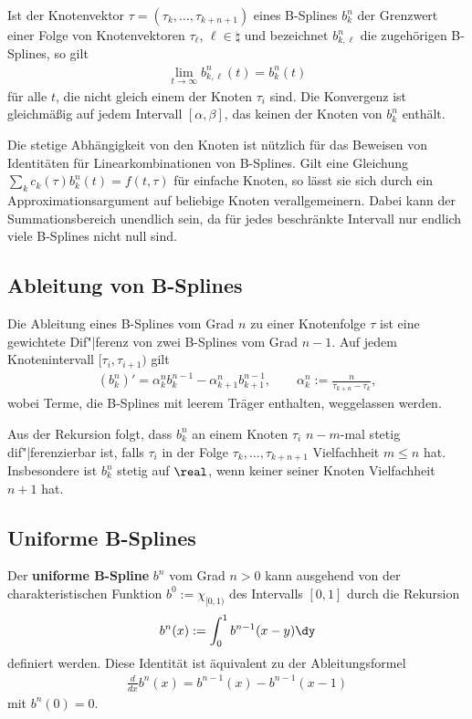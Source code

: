 Ist der Knotenvektor $\tau = (\tau_k, \dotsc, \tau_{k+n+1})$ eines B-Splines
$b_k^n$ der Grenzwert einer Folge von Knotenvektoren $\tau_\ell$,
$\ell \in \natural$ und bezeichnet $b_{k,\ell}^n$ die zugehörigen B-Splines,
so gilt
\begin{align*}
    \lim_{t \to \infty} b_{k,\ell}^n(t) = b_k^n(t)
\end{align*}
für alle $t$, die nicht gleich einem der Knoten $\tau_i$ sind.
Die Konvergenz ist gleichmäßig auf jedem Intervall $[\alpha, \beta]$,
das keinen der Knoten von $b_k^n$ enthält.

\linie

Die stetige Abhängigkeit von den Knoten ist nützlich für das Beweisen von
Identitäten für Linearkombinationen von B-Splines.
Gilt eine Gleichung $\sum_k c_k(\tau) b_k^n(t) = f(t, \tau)$
für einfache Knoten, so lässt sie sich durch ein Approximationsargument auf
beliebige Knoten verallgemeinern.
Dabei kann der Summationsbereich unendlich sein, da für jedes beschränkte
Intervall nur endlich viele B-Splines nicht null sind.

\pagebreak

\subsection{%
    Ableitung von B-Splines%
}

Die Ableitung eines B-Splines vom Grad $n$ zu einer Knotenfolge $\tau$ ist
eine gewichtete Dif"|ferenz von zwei B-Splines vom Grad $n - 1$.
Auf jedem Knotenintervall $[\tau_i, \tau_{i+1})$ gilt
\begin{align*}
    (b_k^n)' = \alpha_k^n b_k^{n-1} - \alpha_{k+1}^n b_{k+1}^{n-1}, \qquad
    \alpha_k^n := \frac{n}{\tau_{k+n} - \tau_k},
\end{align*}
wobei Terme, die B-Splines mit leerem Träger enthalten, weggelassen werden.

Aus der Rekursion folgt, dass $b_k^n$ an einem Knoten $\tau_i$ $n - m$-mal
stetig dif"|ferenzierbar ist, falls $\tau_i$ in der Folge
$\tau_k, \dotsc, \tau_{k+n+1}$ Vielfachheit $m \le n$ hat.
Insbesondere ist $b_k^n$ stetig auf $\real$, wenn keiner seiner Knoten
Vielfachheit $n + 1$ hat.

\subsection{%
    Uniforme B-Splines%
}

Der \textbf{uniforme B-Spline} $b^n$ vom Grad $n > 0$ kann ausgehend von der
charakteristischen Funktion $b^0 := \chi_{[0,1)}$ des Intervalls $[0, 1]$
durch die Rekursion
\begin{align*}
    b^n(x) := \int_0^1 b^{n-1} (x - y) \dy
\end{align*}
definiert werden.
Diese Identität ist äquivalent zu der Ableitungsformel
\begin{align*}
    \frac{d}{dx} b^n(x) = b^{n-1}(x) - b^{n-1}(x - 1)
\end{align*}
mit $b^n(0) = 0$.

